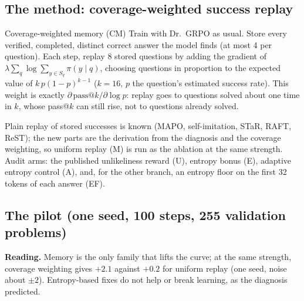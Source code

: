 \documentclass[11pt]{article}
\begin{document}
\subsection{The method: coverage-weighted success replay}
\begin{idea}{Coverage-weighted memory (CM)}
Train with Dr.\ GRPO as usual. Store every verified, completed, distinct correct answer the model finds (at most 4 per question). Each step, replay 8 stored questions by adding the gradient of $\lambda\sum_q\log\sum_{y\in S_q}\pi(y\mid q)$, choosing questions in proportion to the expected value of $k\,p(1-p)^{k-1}$ ($k=16$, $p$ the question's estimated success rate). This weight is exactly $\partial\,\mathrm{pass@}k/\partial\log p$: replay goes to questions solved about one time in $k$, whose pass@$k$ can still rise, not to questions already solved.
\end{idea}
Plain replay of stored successes is known (MAPO, self-imitation, STaR, RAFT, ReST); the new parts are the derivation from the diagnosis and the coverage weighting, so uniform replay (M) is run as the ablation at the same strength. Audit arms: the published unlikeliness reward (U), entropy bonus (E), adaptive entropy control (A), and, for the other branch, an entropy floor on the first 32 tokens of each answer (EF).

\subsection{The pilot (one seed, 100 steps, 255 validation problems)}
\begin{center}\small
{}
\end{center}
\textbf{Reading.} Memory is the only family that lifts the curve; at the same strength, coverage weighting gives $+2.1$ against $+0.2$ for uniform replay (one seed, noise about $\pm2$). Entropy-based fixes do not help or break learning, as the diagnosis predicted.
\end{document}
